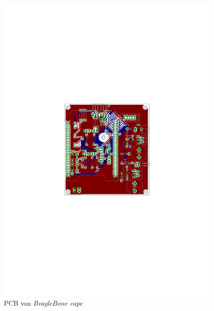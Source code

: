 \begin{figure}
    \includegraphics[scale=.75]{appendix/BeagleBoneCape_pcb.pdf}
    \caption{PCB van \emph{BeagleBone cape}}
\end{figure}
